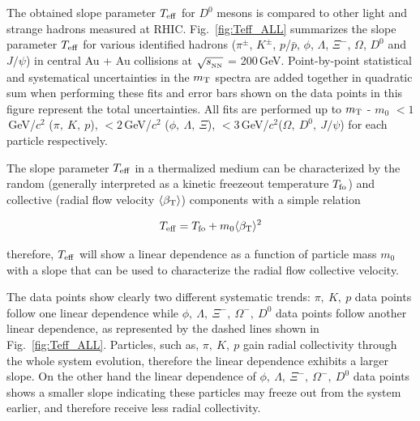 \documentclass[%
 reprint,	
 amsmath,amssymb,
 aps,
 prc,
]{revtex4-1}
\begin{document}

The obtained slope parameter $T_{\rm eff}$ for $D^0$ mesons is compared to other light and strange hadrons measured at RHIC. %
Fig.~\ref{fig:Teff_ALL} summarizes the slope parameter $T_{\rm eff}$ for various identified hadrons ($\pi^{\pm}$, $K^{\pm}$, $p$/$\bar{p}$, $\phi$, $\Lambda$, $\Xi^-$, $\Omega$, $D^0$ and $J/\psi$) in central Au + Au collisions at $\sqrt{s_{_{\rm NN}}}$ = 200\,GeV. Point-by-point statistical and systematical uncertainties in the $m_{\rm T}$ spectra are added together in quadratic sum when performing these fits and error bars shown on the data points in this figure represent the total uncertainties. All fits are performed up to $m_{\rm T}$ - $m_{0}$ $<1$\,GeV/$c^2$ ($\pi,\ K,\ p$), $<2$\,GeV/$c^2$ ($\phi,\ \Lambda,\ \Xi$), $<3$\,GeV/$c^2$($\Omega,\ D^{0},\ J/\psi$) for each particle respectively. 

The slope parameter $T_{\rm eff}$ in a thermalized medium can be characterized by the random (generally interpreted as a kinetic freezeout temperature $T_{\rm fo}$) and collective (radial flow velocity $\langle\beta_{\rm T}\rangle$) components with a simple relation~\cite{StarWhitePaper,Csorgo:1995bi,Kolb:2003dz}

\[
T_{\rm eff} = T_{\rm fo} + m_0 \langle\beta_{\rm T}\rangle^2
\]

therefore, $T_{\rm eff}$ will show a linear dependence as a function of particle mass $m_0$ with a slope that can be used to characterize the radial flow collective velocity.

The data points show clearly two different systematic trends: $\pi,\ K,\ p$ data points follow one linear dependence while $\phi,\ \Lambda,\ \Xi^{-},\ \Omega^{-},\ D^0$ data points follow another linear dependence, as represented by the dashed lines shown in Fig.~\ref{fig:Teff_ALL}. Particles, such as, $\pi,\ K,\ p$ gain radial collectivity through the whole system evolution, therefore the linear dependence exhibits a larger slope. On the other hand the linear dependence of $\phi,\ \Lambda,\ \Xi^{-},\ \Omega^{-},\ D^0$ data points shows a smaller slope indicating these particles may freeze out from the system earlier, and therefore receive less radial collectivity.
\end{document}
